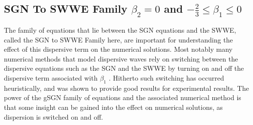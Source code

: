 \documentclass[10pt]{elsarticle}
\begin{document}
\subsection{SGN To SWWE Family $\beta_2 = 0$ and $-\frac{2}{3} \le \beta_1 \le 0$}
The family of equations that lie between the SGN equations and the SWWE, called the SGN to SWWE Family here, are important for understanding the effect of this dispersive term on the numerical solutions. Most notably many numerical methods that model dispersive waves rely on switching between the dispersive equations such as the SGN and the SWWE by turning on and off the dispersive term associated with $\beta_1$ \cite{Filippini-etal-2016-381,doCarmo-etal-2019-125}. Hitherto such switching has occurred heuristically, and was shown to provide good results for experimental results. The power of the gSGN family of equations and the associated numerical method is that some insight can be gained into the effect on numerical solutions, as dispersion is switched on and off. 
\end{document}
